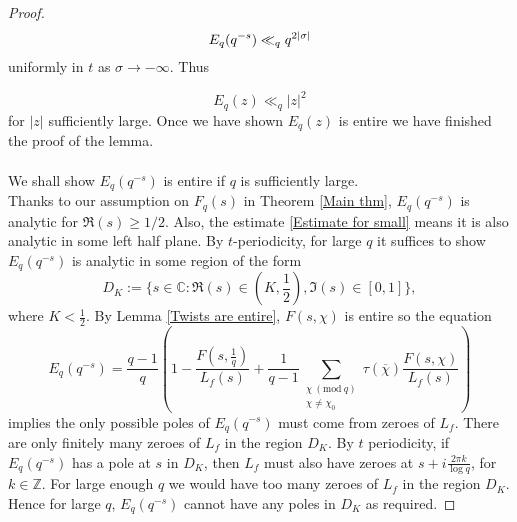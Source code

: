 \documentclass[a4paper,12.5pt]{amsart}
\theoremstyle{definition}
\theoremstyle{remark}
\newcommand{\F}{L_f}
\newcommand{\Mod}[1]{\ (\mathrm{mod}\ #1)}
\begin{document}
\begin{proof}
          
 
 \begin{equation}{\label{Estimate for small}}
     E_q(q^{-s}) \ll_q q^{2 |\sigma| } 
 \end{equation}     
  uniformly in $t$ as $\sigma \rightarrow -\infty$. Thus 
 
  \[ E_q(z) \ll_q |z|^{2}     \]
 for $|z|$ sufficiently large. Once we have shown $E_q(z)$ is entire we have finished the proof of the lemma.   \\ \\
 
 We shall show $E_q(q^{-s})$ is entire if $q$ is sufficiently large. \\ 
  Thanks to our assumption on $F_q(s)$ in Theorem \ref{Main thm}, $E_q(q^{-s})$ is analytic for $\Re(s) \geq 1/2$. Also, the estimate \eqref{Estimate for small} means it is also analytic in some left half plane. By $t$-periodicity, for large $q$ it suffices to show $E_q(q^{-s})$ is analytic in some region of the form 
  \[ D_K:= \{ s \in \mathbb{C}: \Re(s) \in (K, \frac{1}{2}), \Im(s) \in [0,1]                  \}                   ,    \]
  where $K< \frac{1}{2}$. By Lemma \ref{Twists are entire}, $F(s,\chi)$ is entire so the equation 
 \[ E_q(q^{-s})= \frac{q-1}{q}\left( 1 - \frac{F(s, \frac{1}{q})}{\F(s)} + \frac{1}{q-1} \sum_{ \substack{  \chi \Mod q  \\ 
 \chi \neq \chi_0   }     }  \tau(\overline{\chi})  \frac{F(s, \chi)}{\F(s)}                \right)         \]
implies the only possible  poles of $E_q(q^{-s})$ must come from zeroes of $\F$. There are only finitely many zeroes of $\F$ in the region $D_K$. By $t$ periodicity, if $E_q(q^{-s})$ has a pole at $s$ in  $D_K$, then $\F$ must also have zeroes at $s+ i \frac{ 2 \pi k }{\log q} $, for $k \in \mathbb{Z}$. For large enough $q$ we would have too many zeroes of $\F$ in the region $D_K$. Hence for large $q$, $E_q(q^{-s})$ cannot have any poles in $D_K$ as required. 




 \end{proof}
\end{document}
